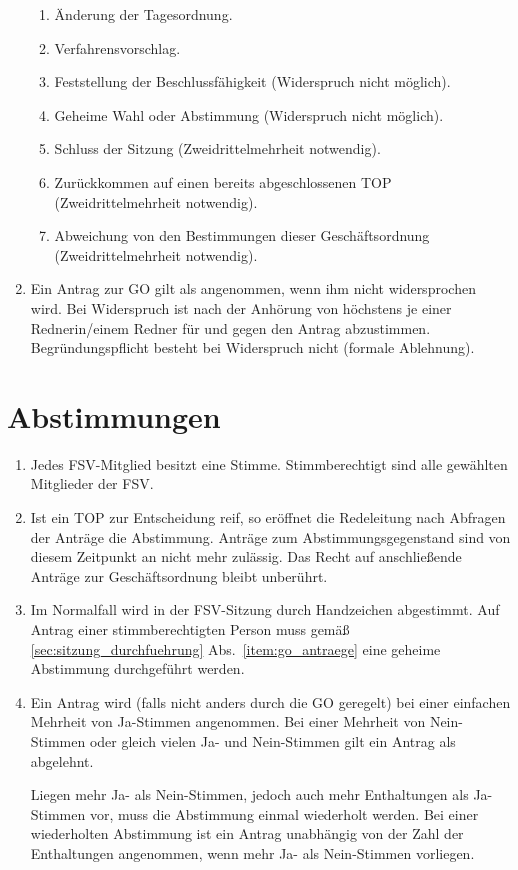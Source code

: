 \begin{enumerate}
\begin{enumerate}
		\item Änderung der Tagesordnung.
		\item Verfahrensvorschlag.
		\item Feststellung der Beschlussfähigkeit (Widerspruch nicht möglich).
		\item Geheime Wahl oder Abstimmung (Widerspruch nicht möglich).
		\item Schluss der Sitzung (Zweidrittelmehrheit notwendig).
		\item Zurückkommen auf einen bereits abgeschlossenen TOP (Zweidrittelmehrheit notwendig).
		\item Abweichung von den Bestimmungen dieser Geschäftsordnung (Zweidrittelmehrheit notwendig).
	\end{enumerate}
	\item Ein Antrag zur GO gilt als angenommen, wenn ihm nicht widersprochen wird.
	Bei Widerspruch ist nach der Anhörung von höchstens je einer Rednerin/einem Redner für und gegen den Antrag abzustimmen.
	Begründungspflicht besteht bei Widerspruch nicht (formale Ablehnung).
\end{enumerate}

\section{Abstimmungen}
\begin{enumerate}
	\item Jedes FSV-Mitglied besitzt eine Stimme.
	Stimmberechtigt sind alle gewählten Mitglieder der FSV.
	\item Ist ein TOP zur Entscheidung reif, so eröffnet die Redeleitung nach Abfragen der Anträge die Abstimmung.
	Anträge zum Abstimmungsgegenstand sind von diesem Zeitpunkt an nicht mehr zulässig.
	Das Recht auf anschließende Anträge zur Geschäftsordnung bleibt unberührt.
	\item Im Normalfall wird in der FSV-Sitzung durch Handzeichen abgestimmt.
	Auf Antrag einer stimmberechtigten Person muss gemäß \ref{sec:sitzung_durchfuehrung} Abs.~\ref{item:go_antraege} eine geheime Abstimmung durchgeführt werden.
	\item Ein Antrag wird (falls nicht anders durch die GO geregelt) bei einer einfachen Mehrheit von Ja-Stimmen angenommen.
	Bei einer Mehrheit von Nein-Stimmen oder gleich vielen Ja- und Nein-Stimmen gilt ein Antrag als abgelehnt.
	
	Liegen mehr Ja- als Nein-Stimmen, jedoch auch mehr Enthaltungen als Ja-Stimmen vor, muss die Abstimmung einmal wiederholt werden.
	Bei einer wiederholten Abstimmung ist ein Antrag unabhängig von der Zahl der Enthaltungen angenommen, wenn mehr Ja- als Nein-Stimmen vorliegen.
\end{enumerate}

